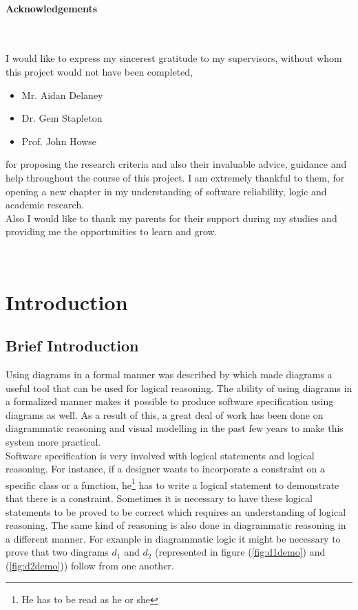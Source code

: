 \documentclass[10pt, a4paper, titlepage]{article}
\begin{document}
~\vfill\begin{minipage}{\textwidth}  
\begin{LARGE}\textbf{Acknowledgements}\end{LARGE}\\\\


I would like to express my sincerest gratitude to my supervisors, without whom this project would not have been completed,

\begin{itemize}
\item Mr. Aidan Delaney
\item Dr. Gem Stapleton
\item Prof. John Howse 
\end{itemize}


for proposing the research criteria and also their invaluable advice, guidance and help throughout the course of this project. I am extremely thankful to them, for opening a new chapter in my understanding of software reliability, logic and academic research.\\

Also I would like to thank my parents for their support during my studies and providing me the opportunities to learn and grow. 


\end{minipage}\vfill~\newpage
\newpage
\tableofcontents
\linespread{1.3}
\large
\newpage


\newpage
\section{Introduction} 
\label{sec:introduction}

\subsection{Brief Introduction}
Using diagrams in a formal manner was described by \cite{Shin_1994} which made diagrams a useful tool that can be used for logical reasoning. The ability of using diagrams in a formalized manner makes it possible to produce software specification using diagrams as well. As a result of this, a great deal of work has been done on diagrammatic reasoning and visual modelling in the past few years to make this system more practical. \\
Software specification is very involved with logical statements and logical reasoning. For instance, if a designer wants to incorporate a constraint on a specific class or a function, he\footnote{He has to be read as he or she} has to write a logical statement to demonstrate that there is a constraint. Sometimes it is necessary to have these logical statements to be proved to be correct which requires an understanding of logical reasoning. The same kind of reasoning is also done in diagrammatic reasoning in a different manner. For example in diagrammatic logic it might be necessary to prove that two diagrams $ d_{1} $ and $ d_{2} $ (represented in figure (\ref{fig:d1demo}) and (\ref{fig:d2demo})) follow from one another.
\end{document}
